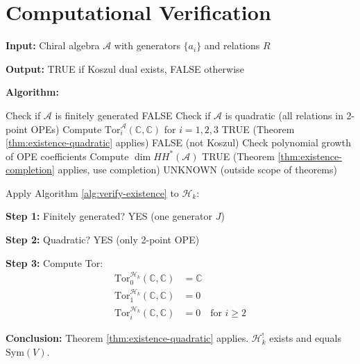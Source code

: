 \section{Computational Verification}

\begin{algorithm_env}
\label{alg:verify-existence}
\textbf{Input:} Chiral algebra $\mathcal{A}$ with generators $\{a_i\}$ and relations $R$

\textbf{Output:} TRUE if Koszul dual exists, FALSE otherwise

\textbf{Algorithm:}
\begin{algorithmic}[1]
\State Check if $\mathcal{A}$ is finitely generated
    \State \Return FALSE
\EndIf
\State
\State Check if $\mathcal{A}$ is quadratic (all relations in 2-point OPEs)
    \State Compute $\text{Tor}_i^{\mathcal{A}}(\mathbb{C}, \mathbb{C})$ for $i = 1, 2, 3$
        \State \Return TRUE (Theorem \ref{thm:existence-quadratic} applies)
    \Else
        \State \Return FALSE (not Koszul)
    \EndIf
\Else
    \State Check polynomial growth of OPE coefficients
    \State Compute $\dim HH^*(\mathcal{A})$
        \State \Return TRUE (Theorem \ref{thm:existence-completion} applies, use completion)
    \Else
        \State \Return UNKNOWN (outside scope of theorems)
    \EndIf
\EndIf
\end{algorithmic}
\end{algorithm_env}

\begin{example}
Apply Algorithm \ref{alg:verify-existence} to $\mathcal{H}_k$:

\textbf{Step 1:} Finitely generated? YES (one generator $J$)

\textbf{Step 2:} Quadratic? YES (only 2-point OPE)

\textbf{Step 3:} Compute Tor:
\begin{align}
\text{Tor}_0^{\mathcal{H}_k}(\mathbb{C}, \mathbb{C}) &= \mathbb{C} \\
\text{Tor}_1^{\mathcal{H}_k}(\mathbb{C}, \mathbb{C}) &= 0 \\
\text{Tor}_i^{\mathcal{H}_k}(\mathbb{C}, \mathbb{C}) &= 0 \quad \text{for } i \geq 2
\end{align}

\textbf{Conclusion:} Theorem \ref{thm:existence-quadratic} applies. $\mathcal{H}_k^!$ exists and equals $\text{Sym}(V)$.
\end{example}

